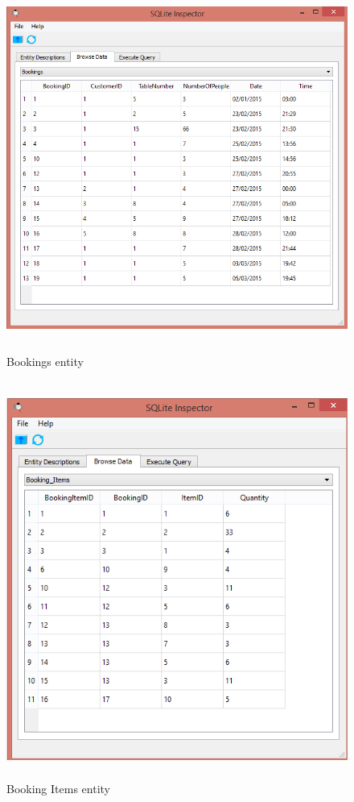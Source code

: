 \begin{figure}[H]
    \includegraphics[height = 12cm]{./Maintenance/images/bookings}
    \caption{Bookings entity} \label{fig:bookings}
\end{figure}

\begin{figure}[H]
    \includegraphics[height = 13cm]{./Maintenance/images/bookingitems}
    \caption{Booking Items entity} \label{fig:bookingitems}
\end{figure}

